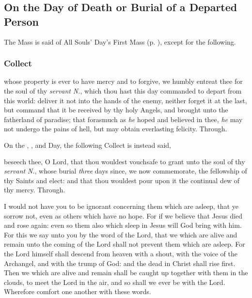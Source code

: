 \subsection{On the Day of Death or Burial of a Departed Person}

\begin{rubric}
    The Mass is said of All Souls' Day's First Mass (p. \pageref{AllSouls}), except for the following.
\end{rubric}

\subsubsection{Collect}
 whose property is ever to have mercy and to forgive, we humbly entreat thee for the soul of thy \textit{servant} \textit{N.}, which thou hast this day commanded to depart from this world: deliver it not into the hands of the enemy, neither forget it at the last, but command that it be received by thy holy Angels, and brought unto the fatherland of paradise; that forasmuch as \textit{he} hoped and believed in thee, \textit{he} may not undergo the pains of hell, but may obtain everlasting felicity. Through.

\begin{rubric}
    On the , , and  Day, the following Collect is instead said,
\end{rubric}
 beseech thee, O Lord, that thou wouldest vouchsafe to grant unto the soul of thy \textit{servant} \textit{N.}, whose burial \textit{three} days since, we now commemorate, the fellowship of thy Saints and elect: and that thou wouldest pour upon it the continual dew of thy mercy. Through.

 I would not have you to be ignorant concerning them which are asleep, that ye sorrow not, even as others which have no hope. For if we believe that Jesus died and rose again: even so them also which sleep in Jesus will God bring with him. For this we say unto you by the word of the Lord, that we which are alive and remain unto the coming of the Lord shall not prevent them which are asleep. For the Lord himself shall descend from heaven with a shout, with the voice of the Archangel, and with the trump of God: and the dead in Christ shall rise first. Then we which are alive and remain shall be caught up together with them in the clouds, to meet the Lord in the air, and so shall we ever be with the Lord. Wherefore comfort one another with these words.


